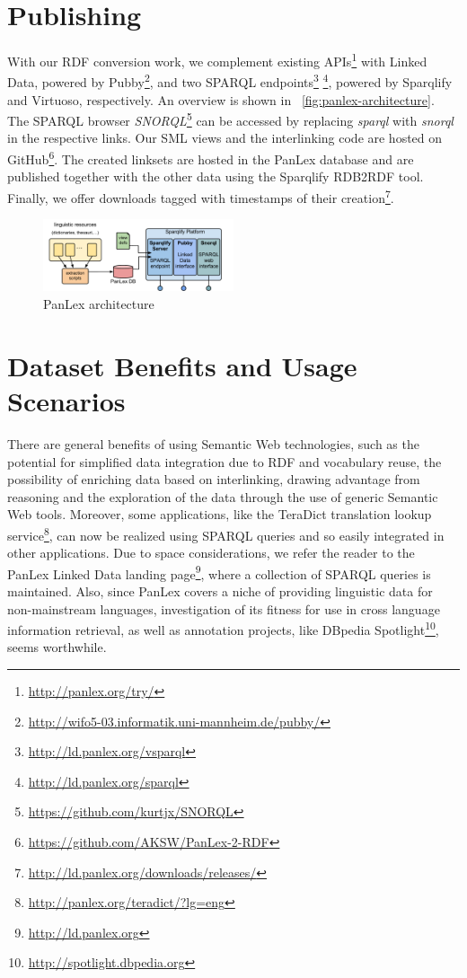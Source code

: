 \documentclass[sw]{iosart2c}
\begin{document}
\section{Publishing}
\label{sec:publishing}
With our RDF conversion work, we complement existing
APIs\footnote{\url{http://panlex.org/try/}} with Linked Data, powered by
Pubby\footnote{\tiny{\url{http://wifo5-03.informatik.uni-mannheim.de/pubby/}}},
and two SPARQL
endpoints\footnote{\url{http://ld.panlex.org/vsparql}}
\footnote{\url{http://ld.panlex.org/sparql}}, powered by Sparqlify and Virtuoso,
respectively.
An overview is shown in ~\autoref{fig:panlex-architecture}.
The SPARQL browser
\emph{SNORQL}\footnote{\url{https://github.com/kurtjx/SNORQL}} can be accessed
by replacing \emph{sparql} with \emph{snorql} in the respective links. Our SML
views and the interlinking code are hosted on GitHub\footnote{\url{https://github.com/AKSW/PanLex-2-RDF}}.
The created linksets are hosted in the PanLex database and are published together with the other data using the Sparqlify RDB2RDF tool.
Finally, we offer downloads tagged with timestamps of their creation\footnote{\url{http://ld.panlex.org/downloads/releases/}}.
\begin{figure}
\centering
\includegraphics[width=0.5\textwidth]{images/pdf/sparqlify_setup02.pdf}
\caption{PanLex architecture}
\label{fig:panlex-architecture}
\end{figure}

\section{Dataset Benefits and Usage Scenarios}
\label{sec:usage}
There are general benefits of using Semantic Web technologies, such as the
potential for simplified data integration due to RDF and vocabulary reuse, the
possibility of enriching data based on interlinking, drawing advantage from
reasoning and the exploration of the data through the use of generic Semantic
Web tools.
Moreover, some applications, like the TeraDict translation lookup
service\footnote{\url{http://panlex.org/teradict/?lg=eng}}, can now be realized
using SPARQL queries and so easily integrated in other applications.
Due to space considerations, we refer the reader to the PanLex Linked Data
landing page\footnote{\url{http://ld.panlex.org}}, where a
collection of SPARQL queries is maintained.
Also, since PanLex covers a niche of providing linguistic data for
non-mainstream languages, investigation of its fitness for use in cross
language information retrieval, as well as annotation projects, like DBpedia
Spotlight\footnote{\url{http://spotlight.dbpedia.org}}, seems worthwhile.
\end{document}
